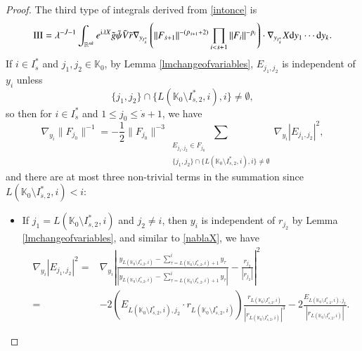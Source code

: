 \documentclass[11pt,reqno]{amsart}
\def\d{{\rm d}}
\numberwithin{equation}{section}
\theoremstyle{definition}
\begin{document}
\begin{proof}
	The third type of integrals derived from \eqref{intonce} is
	\begin{equation*}
		\mathrm{III}=\lambda^{-\dot{J}-1}\int_{\mathbb{R}^{nk}}e^{\mathrm{i}\lambda X}\tilde{g}\tilde{\psi}\tilde{V}\tilde{r}\nabla_{y_{I_{\dot{s}}^*}}\left(\|F_{\dot{s}+1}\|^{-(\dot{p}_{\dot{s}+1}+2)}\prod_{i<\dot{s}+1}\|F_i\|^{-{\dot{p}_i}}\right)\cdot\nabla_{y_{I_{\dot{s}}^*}}X\d y_1\cdots \d y_k.
	\end{equation*}
	If $i\in I_{\dot{s}}^*$ and $j_1,j_2\in\mathbb{K}_0$, by Lemma \ref{lmchangeofvariables}, $E_{j_1,j_2}$ is independent of $y_i$ unless
	\begin{equation*}\label{j_1j_2}
		\{j_1,j_2\}\cap\{L(\mathbb{K}_0\setminus I_{\dot{s},2}^*,i),i\}\neq\emptyset,
	\end{equation*}
	so then for $i\in I_{\dot{s}}^*$ and $1\leq j_0\leq\dot{s}+1$, we have
	\begin{equation*}
		\nabla_{y_i}\|F_{j_0}\|^{-1}=-\mbox{$\frac12$}\|F_{j_0}\|^{-3}\sum_{\substack{E_{j_1,j_2}\in F_{j_0}\\\{j_1,j_2\}\cap\{L(\mathbb{K}_0\setminus I_{\dot{s},2}^*,i),i\}\neq\emptyset}}\nabla_{y_i}\left|E_{j_1,j_2}\right|^2,
	\end{equation*}
	and there are at most three non-trivial terms in the summation since $L(\mathbb{K}_0\setminus I_{\dot{s},2}^*,i)<i$:
	\begin{itemize}
		\item If $j_1=L(\mathbb{K}_0\setminus I_{\dot{s},2}^*,i)$ and $j_2\neq i$, then $y_i$ is independent of $r_{j_2}$ by Lemma \ref{lmchangeofvariables}, and similar to \eqref{nablaX}, we have
		\begin{equation*}
			\begin{split}
				\nabla_{y_i}\left|E_{j_1,j_2}\right|^2=&\nabla_{y_i}\left|\frac{y_{L(\mathbb{K}_0\setminus I_{\dot{s},2}^*,i)}-\mbox{$\sum_{\tau=L(\mathbb{K}_0\setminus I_{\dot{s},2}^*,i)+1}^{i}y_\tau$}}{|y_{L(\mathbb{K}_0\setminus I_{\dot{s},2}^*,i)}-\mbox{$\sum_{\tau=L(\mathbb{K}_0\setminus I_{\dot{s},2}^*,i)+1}^{i}y_\tau$}|}-\frac{r_{j_2}}{|r_{j_2}|}\right|^2\\
				=&-2\left(E_{L(\mathbb{K}_0\setminus I_{\dot{s},2}^*,i),j_2}\cdot r_{L(\mathbb{K}_0\setminus I_{\dot{s},2}^*,i)}\right)\frac{r_{L(\mathbb{K}_0\setminus I_{\dot{s},2}^*,i)}}{|r_{L(\mathbb{K}_0\setminus I_{\dot{s},2}^*,i)}|^3}-2\frac{E_{L(\mathbb{K}_0\setminus I_{\dot{s},2}^*,i),j_2}}{|r_{L(\mathbb{K}_0\setminus I_{\dot{s},2}^*,i)}|}.
			\end{split}
		\end{equation*}
		

\end{itemize}
\end{proof}
\end{document}

